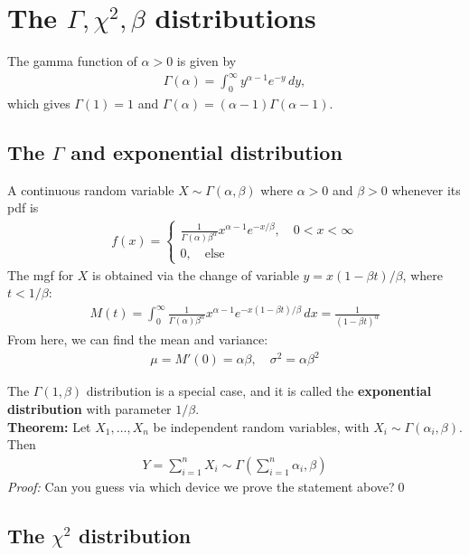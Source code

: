 \documentclass{book}
\theoremstyle{definition}
\newcommand{\f}[2]{\frac{#1}{#2}}
\newcommand{\lp}{\left(}
\newcommand{\rp}{\right)}
\begin{document}
\section{The $\Gamma, \chi^2, \beta$ distributions}

The gamma function of $\alpha > 0$ is given by
\begin{align}
\Gamma(\alpha) =\int^\infty_0 y^{\alpha-1}e^{-y}\,dy,
\end{align}
which gives $\Gamma(1) = 1$ and $\Gamma(\alpha) = (\alpha-1)\Gamma(\alpha-1)$. 

\subsection{The $\Gamma$ and exponential distribution}
A continuous random variable $X \sim \Gamma(\alpha,\beta)$ where $\alpha > 0$ and $\beta > 0$ whenever its pdf is
\begin{align}
\boxed{f(x) = \begin{cases}
	\f{1}{\Gamma(\alpha)\beta^\alpha}x^{\alpha-1} e^{-x/\beta}, \quad 0 < x < \infty\\
	0, \quad \text{else}
	\end{cases}}
\end{align}
The mgf for $X$ is obtained via the change of variable $y = x(1-\beta t)/\beta$, where $t < 1/\beta$:
\begin{align}
\boxed{M(t) = \int^\infty_0 \f{1}{\Gamma(\alpha)\beta^\alpha} x^{\alpha-1} e^{-x(1-\beta t)/\beta}\,dx = \f{1}{(1-\beta t)^\alpha}}
\end{align}
From here, we can find the mean and variance:
\begin{align}
\boxed{\mu = M'(0) = \alpha\beta, \quad \sigma^2 = \alpha \beta^2}
\end{align}

The $\Gamma(1,\beta)$ distribution is a special case, and it is called the \textbf{exponential distribution} with parameter $1/\beta$.\\

\noindent\textbf{Theorem:} Let $X_1, \dots, X_n$ be independent random variables, with $X_i \sim \Gamma(\alpha_i, \beta)$. Then
\begin{align}
\boxed{Y = \sum^n_{i=1} X_i \sim \Gamma\lp \sum^n_{i=1}\alpha_i, \beta \rp}
\end{align} 
\noindent\textit{Proof:} Can you guess via which device we prove the statement above?\qed


\subsection{The $\chi^2$ distribution}
\end{document}
